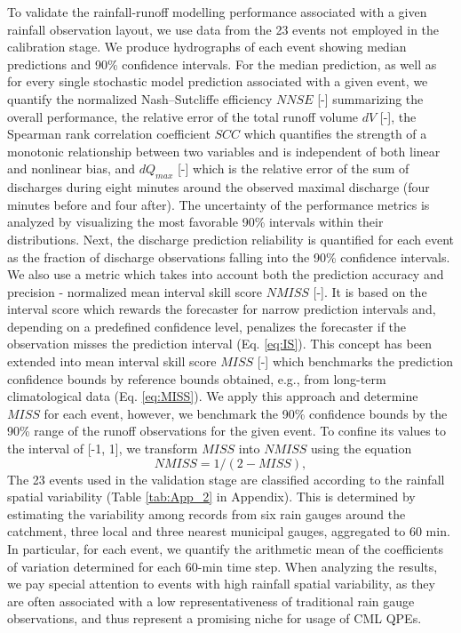 \documentclass{ctuthesis}\usepackage[]{graphicx}\usepackage[]{color}
\begin{document}
To validate the rainfall-runoff modelling performance associated with a given rainfall observation layout, we use data from the 23 events not employed in the calibration stage. We produce hydrographs of each event showing median predictions and 90\% confidence intervals. For the median prediction, as well as for every single stochastic model prediction associated with a given event, we quantify the normalized Nash–Sutcliffe efficiency $N\!N\!S\!E$ [-] summarizing the overall performance, the relative error of the total runoff volume $dV$ [-], the Spearman rank correlation coefficient $S\!C\!C$ which quantifies the strength of a monotonic relationship between two variables and is independent of both linear and nonlinear bias, and $dQ_{max}$ [-] which is the relative error of the sum of discharges during eight minutes around the observed maximal discharge (four minutes before and four after). The uncertainty of the performance metrics is analyzed by visualizing the most favorable 90\% intervals within their distributions. Next, the discharge prediction reliability is quantified for each event as the fraction of discharge observations falling into the 90\% confidence intervals. We also use a metric which takes into account both the prediction accuracy and precision - normalized mean interval skill score $N\!M\!I\!S\!S$ [-]. It is based on the interval score \citep{gneiting2007strictly, breinholtFormalStatisticalApproach2012} which rewards the forecaster for narrow prediction intervals and, depending on a predefined confidence level, penalizes the forecaster if the observation misses the prediction interval (Eq. \ref{eq:IS}). This concept has been extended into mean interval skill score $M\!I\!S\!S$ [-] \citep{bourginTransferringGlobalUncertainty2015, bockQuantifyingUncertaintySimulated2018} which benchmarks the prediction confidence bounds by reference bounds obtained, e.g., from long-term climatological data (Eq. \ref{eq:MISS}). We apply this approach and determine $M\!I\!S\!S$ for each event, however, we benchmark the 90\% confidence bounds by the 90\% range of the runoff observations for the given event. To confine its values to the interval of [-1, 1], we transform $M\!I\!S\!S$ into $N\!M\!I\!S\!S$ using the equation
\begin{equation} \label{eq:pIIIeq1}
N\!M\!I\!S\!S = 1  /  (2 -  M\!I\!S\!S ),  
\end{equation}
The 23 events used in the validation stage are classified according to the rainfall spatial variability (Table \ref{tab:App_2} in Appendix). This is determined by estimating the variability among records from six rain gauges around the catchment, three local and three nearest municipal gauges, aggregated to 60 min. In particular, for each event, we quantify the arithmetic mean of the coefficients of variation determined for each 60-min time step. When analyzing the results, we pay special attention to events with high rainfall spatial variability, as they are often associated with a low representativeness of traditional rain gauge observations, and thus represent a promising niche for usage of CML QPEs.
\end{document}

